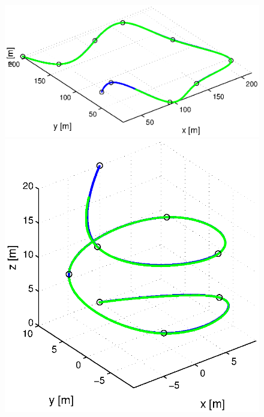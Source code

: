 \begin{figure}[h]
\begin{minipage}[t]{0.32\textwidth}
  \end{minipage}
  \vspace{5pt}
  \begin{minipage}[t]{0.32\textwidth}
    \includegraphics[width = \textwidth]{trackings_wc/figure_3D_road_SplineDegree3_crossTrack_Disturbance_0}
  \end{minipage}
  \hfill
  \begin{minipage}[t]{0.32\textwidth}
    \includegraphics[width = \textwidth]{trackings_wc/figure_3D_helix_SplineDegree3_crossTrack_Disturbance_0}
  \end{minipage}

\end{figure}
